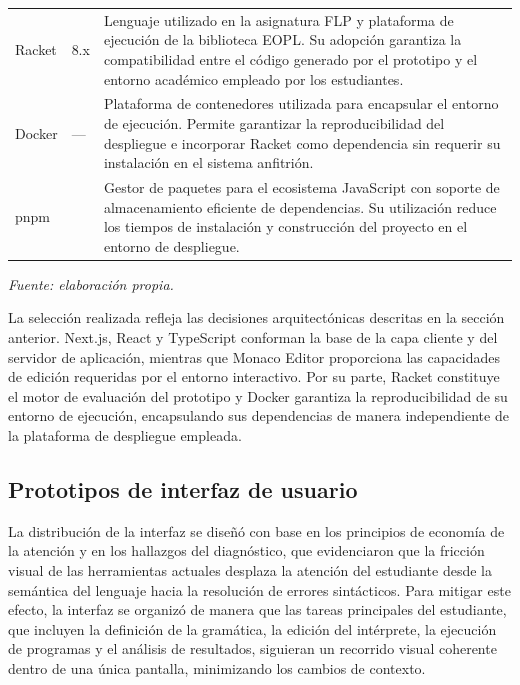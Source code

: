 \begin{table}[H]
\begin{tabular}{
  >{\raggedright\arraybackslash}p{3.2cm}
  >{\centering\arraybackslash}p{1.8cm}
  >{\raggedright\arraybackslash}p{9cm}
}
Racket \cite{felleisen2018racket} & 8.x & Lenguaje utilizado en la asignatura FLP y plataforma de ejecución de la biblioteca EOPL. Su adopción garantiza la compatibilidad entre el código generado por el prototipo y el entorno académico empleado por los estudiantes. \\
Docker \cite{merkel2014docker} & --- & Plataforma de contenedores utilizada para encapsular el entorno de ejecución. Permite garantizar la reproducibilidad del despliegue e incorporar Racket como dependencia sin requerir su instalación en el sistema anfitrión. \\
pnpm \cite{pnpm} & 10 & Gestor de paquetes para el ecosistema JavaScript con soporte de almacenamiento eficiente de dependencias. Su utilización reduce los tiempos de instalación y construcción del proyecto en el entorno de despliegue. \\
\hline
\end{tabular}
\vskip 4pt
\footnotesize\textit{Fuente: elaboración propia.}
\end{table}

\FloatBarrier

La selección realizada refleja las decisiones arquitectónicas descritas en la sección anterior. Next.js, React y TypeScript conforman la base de la capa cliente y del servidor de aplicación, mientras que Monaco Editor proporciona las capacidades de edición requeridas por el entorno interactivo. Por su parte, Racket constituye el motor de evaluación del prototipo y Docker garantiza la reproducibilidad de su entorno de ejecución, encapsulando sus dependencias de manera independiente de la plataforma de despliegue empleada.

\subsection{Prototipos de interfaz de usuario}

La distribución de la interfaz se diseñó con base en los principios de economía de la atención \cite{norman2013design} y en los hallazgos del diagnóstico, que evidenciaron que la fricción visual de las herramientas actuales desplaza la atención del estudiante desde la semántica del lenguaje hacia la resolución de errores sintácticos. Para mitigar este efecto, la interfaz se organizó de manera que las tareas principales del estudiante, que incluyen la definición de la gramática, la edición del intérprete, la ejecución de programas y el análisis de resultados, siguieran un recorrido visual coherente dentro de una única pantalla, minimizando los cambios de contexto.

